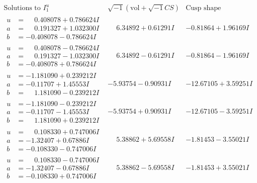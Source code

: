 \documentclass[1p]{elsarticle_modified}
\theoremstyle{definition}
\newcommand{\I}{\sqrt{-1}}
\begin{document}
$$\begin{array}{c|c|c}  
\text{Solutions to }I^u_{1}& \I (\text{vol} + \sqrt{-1}CS) & \text{Cusp shape}\\
 \hline 
\begin{aligned}
u &= \phantom{-}0.408078 + 0.786624 I \\
a &= \phantom{-}0.191327 + 1.032300 I \\
b &= -0.408078 - 0.786624 I\end{aligned}
 & \phantom{-}6.34892 + 0.61291 I & -0.81864 + 1.96169 I \\ \hline\begin{aligned}
u &= \phantom{-}0.408078 - 0.786624 I \\
a &= \phantom{-}0.191327 - 1.032300 I \\
b &= -0.408078 + 0.786624 I\end{aligned}
 & \phantom{-}6.34892 - 0.61291 I & -0.81864 - 1.96169 I \\ \hline\begin{aligned}
u &= -1.181090 + 0.239212 I \\
a &= -0.11707 + 1.45553 I \\
b &= \phantom{-}1.181090 - 0.239212 I\end{aligned}
 & -5.93754 - 0.90931 I & -12.67105 + 3.59251 I \\ \hline\begin{aligned}
u &= -1.181090 - 0.239212 I \\
a &= -0.11707 - 1.45553 I \\
b &= \phantom{-}1.181090 + 0.239212 I\end{aligned}
 & -5.93754 + 0.90931 I & -12.67105 - 3.59251 I \\ \hline\begin{aligned}
u &= \phantom{-}0.108330 + 0.747006 I \\
a &= -1.32407 + 0.67886 I \\
b &= -0.108330 - 0.747006 I\end{aligned}
 & \phantom{-}5.38862 + 5.69558 I & -1.81453 - 3.55021 I \\ \hline\begin{aligned}
u &= \phantom{-}0.108330 - 0.747006 I \\
a &= -1.32407 - 0.67886 I \\
b &= -0.108330 + 0.747006 I\end{aligned}
 & \phantom{-}5.38862 - 5.69558 I & -1.81453 + 3.55021 I \\ \hline\begin{aligned}

\end{aligned}
\end{array}$$
\end{document}

